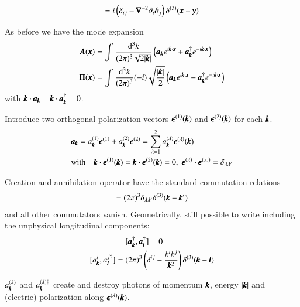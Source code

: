 \begin{align}
	[A_i(\pmb{x}), \Pi_j(\pmb{y})] = i \left( \delta_{ij} - \vecnab^{-2}\partial_i \partial_j \right) \delta^{(3)} (\pmb{x} - \pmb{y})
\end{align}

As before we have the mode expansion
\begin{align*}
	\pmb{A}(\pmb{x}) &= \int \frac{\dd^3 k}{(2\pi)^3\sqrt{2|\pmb{k}|}} \left( \pmb{a}_{\pmb{k}}e^{i\pmb{k}\cdot\pmb{x}} + \pmb{a}^\dagger_{\pmb{k}} e^{-i\pmb{k}\cdot\pmb{x}} \right) \\
	\pmb{\Pi}(\pmb{x}) &= \int \frac{\dd^3 k}{(2\pi)^3} (-i)\sqrt{\frac{|\pmb{k}|}{2}}\left( \pmb{a}_{\pmb{k}}e^{i\pmb{k}\cdot\pmb{x}} - \pmb{a}^\dagger_{\pmb{k}} e^{-i\pmb{k}\cdot\pmb{x}} \right) \\
\end{align*}
with $\pmb{k}\cdot\pmb{a}_{\pmb{k}} = \pmb{k}\cdot\pmb{a}^\dagger_{\pmb{k}} = 0$.

Introduce two orthogonal polarization vectors $\pmb{\epsilon}^{(1)}(\pmb{k})$ and $\pmb{\epsilon}^{(2)}(\pmb{k})$ for each $\pmb{k}$.
\begin{align*}
	&\pmb{a}_{\pmb{k}} = a_{\pmb{k}}^{(1)}\pmb{\epsilon}^{(1)} + a_{\pmb{k}}^{(2)}\pmb{\epsilon}^{(2)} = \sum_{\lambda=1}^2 a_{\pmb{k}}^{(\lambda)}\pmb{\epsilon}^{(\lambda)}(\pmb{k}) \\
	& \text{with} \quad \pmb{k}\cdot\pmb{\epsilon}^{(1)}(\pmb{k}) = \pmb{k}\cdot\pmb{\epsilon}^{(2)}(\pmb{k}) = 0,\; \pmb{\epsilon}^{(\lambda)}\cdot \pmb{\epsilon}^{(\lambda;)}=\delta_{\lambda \lambda'}
\end{align*}

Creation and annihilation operator have the standard commutation relations
\begin{align}
	[a_{\veck}^{(\lambda)}, a_{\veck'}^{(\lambda')\dagger}] = (2\pi)^3 \delta_{\lambda\lambda'}\delta^{(3)}(\veck-\veck')
\end{align} 
and all other commutators vanish. Geometrically, still possible to write including the unphysical longitudinal components:
\begin{align*}
	[\pmb{a}_{\veck}, \pmb{a}_{\pmb{l}}] &= 	[\pmb{a}_{\veck}^\dagger, \pmb{a}_{\pmb{l}}^\dagger] = 0 \\
	[a^i_{\veck}, a_{\pmb{l}}^{j\dagger}] &= (2\pi)^3 \left( \delta^{ij} - \frac{k^i k^j}{\veck^2} \right) \delta^{(3)}(\veck-\pmb{l})
\end{align*}

$a_{\pmb{k}}^{(\lambda)}$ and $a_{\pmb{k}}^{(\lambda)\dagger}$ create and destroy photons of momentum $\pmb{k}$, energy $|\pmb{k}|$ and (electric) polarization along $\pmb{\epsilon}^{(\lambda)}(\pmb{k})$. 

